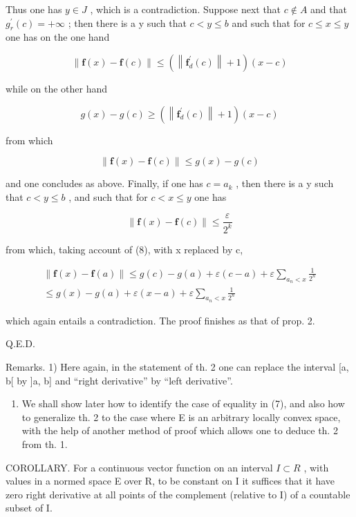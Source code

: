 Thus one has \(y \in J\) , which is a contradiction. Suppose next that \(c \notin A\) and that \(g_{r}^{\prime}(c) = +\infty\) ; then there is a y such that \(c < y \leqslant b\) and such that for \(c \leqslant x \leqslant y\) one has on the one hand

\[
\left\| \mathbf {f} (x) - \mathbf {f} (c) \right\| \leqslant \left(\left\| \mathbf {f} _ {d} ^ {\prime} (c) \right\| + 1\right) (x - c)
\]

while on the other hand

\[
g (x) - g (c) \geqslant \left(\left\| \mathbf {f} _ {d} ^ {\prime} (c) \right\| + 1\right) (x - c)
\]

from which

\[
\| \mathbf {f} (x) - \mathbf {f} (c) \| \leqslant g (x) - g (c)
\]

and one concludes as above. Finally, if one has \(c = a_{k}\) , then there is a y such that \(c < y \leqslant b\) , and such that for \(c < x \leqslant y\) one has

\[
\| \mathbf {f} (x) - \mathbf {f} (c) \| \leqslant \frac {\varepsilon}{2 ^ {k}}
\]

from which, taking account of (8), with x replaced by c,

\[
\begin{array}{c} \| \mathbf {f} (x) - \mathbf {f} (a) \| \leqslant g (c) - g (a) + \varepsilon (c - a) + \varepsilon \sum_ {a _ {n} <   x} \frac {1}{2 ^ {n}} \\ \leqslant g (x) - g (a) + \varepsilon (x - a) + \varepsilon \sum_ {a _ {n} <   x} \frac {1}{2 ^ {n}} \end{array}
\]

which again entails a contradiction. The proof finishes as that of prop. 2.

Q.E.D.

Remarks. 1) Here again, in the statement of th. 2 one can replace the interval {[}a, b{[} by {]}a, b{]} and ``right derivative'' by ``left derivative''.

\begin{enumerate}
\def\labelenumi{\arabic{enumi})}
\setcounter{enumi}{1}
\tightlist
\item
  We shall show later how to identify the case of equality in (7), and also how to generalize th. 2 to the case where E is an arbitrary locally convex space, with the help of another method of proof which allows one to deduce th. 2 from th. 1.
\end{enumerate}

COROLLARY. For a continuous vector function on an interval \(I \subset R\) , with values in a normed space E over R, to be constant on I it suffices that it have zero right derivative at all points of the complement (relative to I) of a countable subset of I.

